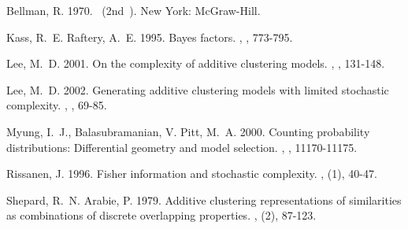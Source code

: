\documentclass[doc,floatsintext]{apa6}
\begin{document}
\begin{thebibliography}{}

Bellman, R.
\newblock{}\BBOP{}1970\BBCP{}.
\newblock{}\ (2nd\ \BEd).
\newblock{}New York: McGraw-Hill.

Kass, R.~E.\BCBT{} \BBA{} Raftery, A.~E.
\newblock{}\BBOP{}1995\BBCP{}.
\newblock{}\BBOQ{}Bayes factors.\BBCQ{}
\newblock{}, ,
  773-795.

Lee, M.~D.
\newblock{}\BBOP{}2001\BBCP{}.
\newblock{}\BBOQ{}On the complexity of additive clustering models.\BBCQ{}
\newblock{}, , 131-148.

Lee, M.~D.
\newblock{}\BBOP{}2002\BBCP{}.
\newblock{}\BBOQ{}Generating additive clustering models with limited stochastic complexity.\BBCQ{}
\newblock{}, , 69-85.

Myung, I.~J., Balasubramanian, V.\BCBL{} \BBA{} Pitt, M.~A.
\newblock{}\BBOP{}2000\BBCP{}.
\newblock{}\BBOQ{}Counting probability distributions: Differential geometry and
  model selection.\BBCQ{}
\newblock{}, ,
  11170-11175.

Rissanen, J.
\newblock{}\BBOP{}1996\BBCP{}.
\newblock{}\BBOQ{}Fisher information and stochastic complexity.\BBCQ{}
\newblock{}, (1), 40-47.

Shepard, R.~N.\BCBT{} \BBA{} Arabie, P.
\newblock{}\BBOP{}1979\BBCP{}.
\newblock{}\BBOQ{}Additive clustering representations of similarities as
  combinations of discrete overlapping properties.\BBCQ{}
\newblock{}, (2), 87-123.

\end{thebibliography}
\end{document}
